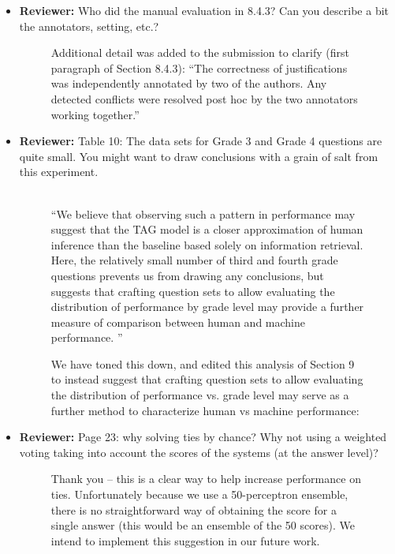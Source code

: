 \documentclass[10pt]{article}
\newcommand{\todo}[1]{\textcolor{red}{TODO: #1}}
\begin{document}
\begin{itemize}
\item \textbf{Reviewer:} Who did the manual evaluation in 8.4.3? Can you describe a bit the
annotators, setting, etc.?

\begin{figure}[H]
\caption{ Additional detail was added to the submission to clarify (first paragraph of Section 8.4.3): ``The correctness of justifications was independently annotated by two of the authors. Any detected conflicts were resolved post hoc by the two annotators working together.''}
\end{figure}

\item \textbf{Reviewer:} Table 10: The data sets for Grade 3 and Grade 4 questions are quite small.
You might want to draw conclusions with a grain of salt from this
experiment.

\begin{figure}[H]
\caption{ We have toned this down, and edited this analysis of Section 9 to instead suggest that crafting question sets to allow evaluating the distribution of performance vs. grade level may serve as a further method to characterize human vs machine performance: }
~\\
``We believe that observing such a pattern in performance may suggest that the TAG model is a closer approximation of human inference than the baseline based solely on information retrieval.  Here, the relatively small number of third and fourth grade questions prevents us from drawing any conclusions, but suggests that crafting question sets to allow evaluating the distribution of performance by grade level may provide a further measure of comparison between human and machine performance. ''
\end{figure}


\item \textbf{Reviewer:} Page 23: why solving ties by chance? Why not using a weighted voting
taking into account the scores of the systems (at the answer level)?

\begin{figure}[H]
\caption{ Thank you -- this is a clear way to help increase performance on ties.  Unfortunately because we use a 50-perceptron ensemble, there is no straightforward way of obtaining the score for a single answer (this would be an ensemble of the 50 scores). We intend to implement this suggestion in our future work. }
\end{figure}

\end{itemize}
\end{document}
